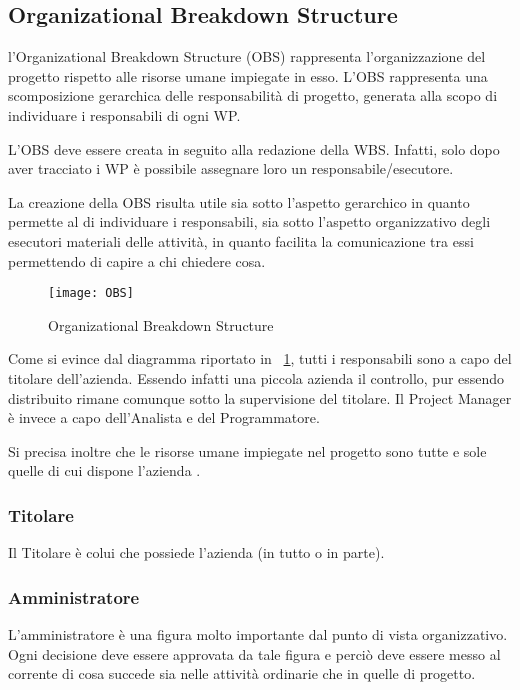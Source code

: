 \subsection{Organizational Breakdown Structure}
l'Organizational Breakdown Structure (OBS) rappresenta l'organizzazione del progetto rispetto alle risorse umane impiegate in esso.
L'OBS rappresenta una scomposizione gerarchica delle responsabilità di progetto, generata alla scopo di individuare i responsabili di ogni WP.

L'OBS deve essere creata in seguito alla redazione della WBS. Infatti, solo dopo aver tracciato i WP è possibile assegnare loro un responsabile/esecutore.

La creazione della OBS risulta utile sia sotto l'aspetto gerarchico in quanto permette al  di individuare i responsabili, sia sotto l'aspetto organizzativo degli esecutori materiali delle attività, in quanto facilita la comunicazione tra essi permettendo di capire a chi chiedere cosa. 

\begin{figure}[h!]
  \texttt{[image: OBS]}
	\caption{Organizational Breakdown Structure}
	\label{fig:obs}
\end{figure}

Come si evince dal diagramma riportato in \figurename~\ref{fig:obs}, tutti i responsabili sono a capo del titolare dell'azienda. Essendo infatti una piccola azienda il controllo, pur essendo distribuito rimane comunque sotto la supervisione del titolare.
Il Project Manager è invece a capo dell'Analista e del Programmatore. 
 
Si precisa inoltre che le risorse umane impiegate nel progetto sono tutte e sole quelle di cui dispone l'azienda \team.

	\subsubsection{Titolare}
	Il Titolare è colui che possiede l'azienda (in tutto o in parte).
	
	\subsubsection{Amministratore}		
	L'amministratore è una figura molto importante dal punto di vista organizzativo. Ogni decisione deve essere approvata da 	tale figura e perciò deve essere messo al corrente di cosa succede sia nelle attività ordinarie che in quelle di progetto.
	
